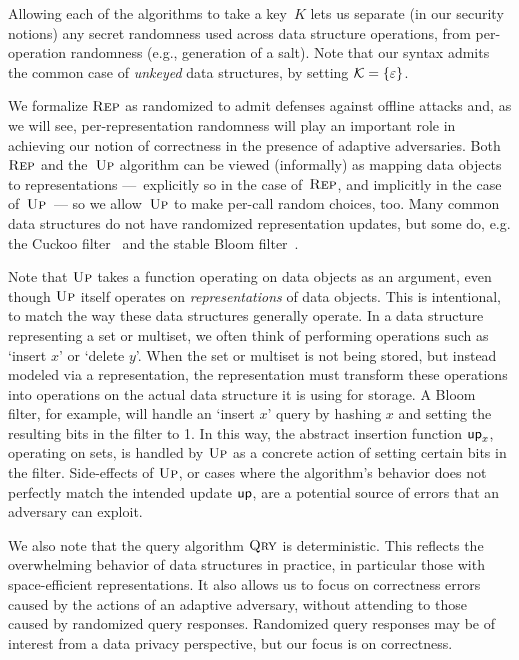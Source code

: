 Allowing each of the algorithms to take a key~$K$ lets us separate (in our
security notions) any secret randomness used across data structure operations,
from per-operation randomness (e.g., generation of a salt).  Note that our syntax admits the
common case of \emph{unkeyed} data structures, by setting
$\mathcal{K}=\{\varepsilon\}$.

We formalize $\textnormal{\textsc{Rep}}$ as randomized to admit defenses against offline attacks and,
as we will see, per-representation randomness will play an important role in
achieving our notion of correctness in the presence of adaptive adversaries.
Both~$\textnormal{\textsc{Rep}}$ and the~$\textnormal{\textsc{Up}}$ algorithm can be viewed (informally) as mapping data
objects to representations ---~explicitly so in the case of~$\textnormal{\textsc{Rep}}$, and
implicitly in the case of~$\textnormal{\textsc{Up}}$~--- so we allow~$\textnormal{\textsc{Up}}$ to make per-call random
choices, too.  Many common data structures do not have randomized representation
updates, but some do, e.g. the Cuckoo filter~\cite{fan2014cuckoo} and the stable
Bloom filter~\cite{deng2006approximately}.

Note that $\textnormal{\textsc{Up}}$ takes a function operating on data objects as an argument, even
though $\textnormal{\textsc{Up}}$ itself operates on \emph{representations} of data objects. This is
intentional, to match the way these data structures generally operate.
In a data structure representing a set or multiset, we often think of performing
operations such as `insert $x$' or `delete $y$'. When the set or multiset is not
being stored, but instead modeled via a representation, the representation must
transform these operations into operations on the actual data structure it is
using for storage.
A Bloom filter, for example, will handle an `insert $x$' query by hashing $x$
and setting the resulting bits in the filter to 1. In this way, the abstract
insertion function $\mathsf{up}_x$, operating on sets, is handled by $\textnormal{\textsc{Up}}$ as a concrete
action of setting certain bits in the filter. Side-effects of $\textnormal{\textsc{Up}}$,
or cases where the algorithm's behavior does not perfectly match the intended
update $\mathsf{up}$, are a potential source of errors that an adversary can exploit.

We also note that the query algorithm $\textnormal{\textsc{Qry}}$ is deterministic.  This reflects
the overwhelming behavior of data structures in practice, in particular those
with space-efficient representations. It also allows us to focus on correctness
errors caused by the actions of an adaptive adversary, without attending to
those caused by randomized query responses.  Randomized query responses may be
of interest from a data privacy perspective, but our focus is on correctness.
